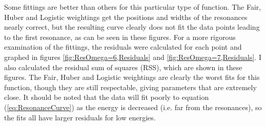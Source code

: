 \documentclass[Dissertation.tex]{subfiles}
\begin{document}
Some fittings are better than others for this particular type of function. The Fair, Huber and Logistic weightings get the positions and widths of the resonances nearly correct, but the resulting curve clearly does not fit the data points leading to the first resonance, as can be seen in these figures. For a more rigorous examination of the fittings, the residuals were calculated for each point and graphed in figures \ref{fig:ResOmega=6,Residuals} and \ref{fig:ResOmega=7,Residuals}. I also calculated the residual sum of squares (RSS), which are shown in these figures. The Fair, Huber and Logistic weightings are clearly the worst fits for this function, though they are still respectable, giving parameters that are extremely close. It should be noted that the data will fit poorly to equation (\ref{eq:ResonanceCurve}) as the energy is decreased (i.e. far from the resonances), so the fits all have larger residuals for low energies.


\cite{Tennyson1984} \cite{Stibbe1998} \cite{Sochi2013}




\biblio
\end{document}
